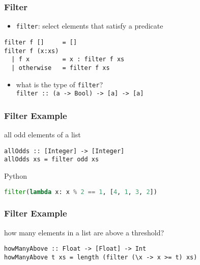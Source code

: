 \documentclass[dvipsnames]{beamer}
\theoremstyle{plain}
\begin{document}
\begin{frame}[fragile]
  \frametitle{Filter}

  \begin{itemize}
    \item \lstinline|filter|: select elements that satisfy a predicate
  \end{itemize}

  \begin{exampleblock}{}
    \begin{lstlisting}[deletekeywords={filter}]
filter f []     = []
filter f (x:xs)
  | f x         = x : filter f xs
  | otherwise   = filter f xs
    \end{lstlisting}
  \end{exampleblock}

  \pause
  \begin{itemize}
    \item what is the type of \lstinline|filter|?\\
      \lstinline|filter :: (a -> Bool) -> [a] -> [a]|
  \end{itemize}
\end{frame}

\begin{frame}[fragile]
  \frametitle{Filter Example}

  \begin{exampleblock}{all odd elements of a list}
    \begin{lstlisting}
allOdds :: [Integer] -> [Integer]
allOdds xs = filter odd xs
    \end{lstlisting}
  \end{exampleblock}

  \bigskip
  \begin{exampleblock}{Python}
    \begin{lstlisting}[language=Python]
filter(lambda x: x % 2 == 1, [4, 1, 3, 2])
    \end{lstlisting}
  \end{exampleblock}
\end{frame}

\begin{frame}[fragile]
  \frametitle{Filter Example}

  \begin{exampleblock}{how many elements in a list are above a threshold?}
    \begin{lstlisting}
howManyAbove :: Float -> [Float] -> Int
howManyAbove t xs = length (filter (\x -> x >= t) xs)
    \end{lstlisting}
  \end{exampleblock}
\end{frame}
\end{document}
